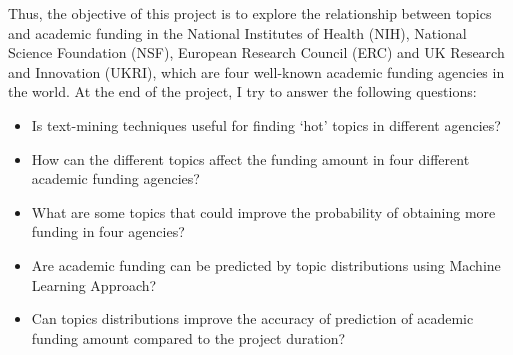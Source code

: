 Thus, the objective of this project is to explore the relationship between topics and academic funding in the National Institutes of Health (NIH), National Science Foundation (NSF), European Research Council (ERC) and UK Research and Innovation (UKRI), which are four well-known academic funding agencies in the world. At the end of the project, I try to answer the following questions:

\begin{itemize}
    \item Is text-mining techniques useful for finding `hot' topics in different agencies?
    \item How can the different topics affect the funding amount in four different academic funding agencies?
    \item What are some topics that could improve the probability of obtaining more funding in four agencies?
    \item Are academic funding can be predicted by topic distributions using Machine Learning Approach?
    \item Can topics distributions improve the accuracy of prediction of academic funding amount compared to the project duration?
\end{itemize}

